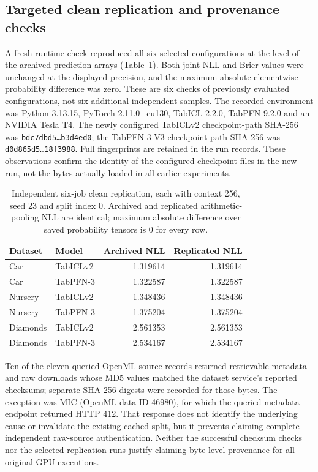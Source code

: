 \documentclass[a4paper,fleqn]{cas-sc}
\begin{document}
\subsection{Targeted clean replication and provenance checks}
A fresh-runtime check reproduced all six selected configurations at the level of the archived prediction arrays (Table~\ref{tab:cleanrep}). Both joint NLL and Brier values were unchanged at the displayed precision, and the maximum absolute elementwise probability difference was zero. These are six checks of previously evaluated configurations, not six additional independent samples. The recorded environment was Python 3.13.15, PyTorch 2.11.0+cu130, TabICL 2.2.0, TabPFN 9.2.0 and an NVIDIA Tesla T4. The newly configured TabICLv2 checkpoint-path SHA-256 was \texttt{bdc7dbd5\ldots b3d4ed0}; the TabPFN-3 V3 checkpoint-path SHA-256 was \texttt{d0d865d5\ldots 18f3988}. Full fingerprints are retained in the run records. These observations confirm the identity of the configured checkpoint files in the new run, not the bytes actually loaded in all earlier experiments.

\begin{table}[htbp]
\centering
\caption{Independent six-job clean replication, each with context 256, seed 23 and split index 0. Archived and replicated arithmetic-pooling NLL are identical; maximum absolute difference over saved probability tensors is 0 for every row.}
\label{tab:cleanrep}
\begin{tabular}{llrr}
\toprule
Dataset & Model & Archived NLL & Replicated NLL\\
\midrule
Car & TabICLv2 & 1.319614 & 1.319614\\
Car & TabPFN-3 & 1.322587 & 1.322587\\
Nursery & TabICLv2 & 1.348436 & 1.348436\\
Nursery & TabPFN-3 & 1.375204 & 1.375204\\
Diamonds & TabICLv2 & 2.561353 & 2.561353\\
Diamonds & TabPFN-3 & 2.534167 & 2.534167\\
\bottomrule
\end{tabular}
\end{table}

Ten of the eleven queried OpenML source records returned retrievable metadata and raw downloads whose MD5 values matched the dataset service's reported checksums; separate SHA-256 digests were recorded for those bytes. The exception was MIC (OpenML data ID 46980), for which the queried metadata endpoint returned HTTP 412. That response does not identify the underlying cause or invalidate the existing cached split, but it prevents claiming complete independent raw-source authentication. Neither the successful checksum checks nor the selected replication runs justify claiming byte-level provenance for all original GPU executions.
\end{document}
